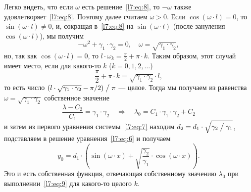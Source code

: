 Легко видеть, что если $\omega$ есть решение~\eqref{l7:eq:8}, то $-\omega$ также удовлетворяет~\eqref{l7:eq:8}. Поэтому далее считаем $\omega>0$. Если $\cos(\omega\cdot l)=0$, то $\sin(\omega\cdot l)\neq0${\mb,} и{\mb,} сокращая в~\eqref{l7:eq:8} на $\sin(\omega\cdot l)$ (после зануления $\cos(\omega\cdot l)$){\mb,} мы получим 
\begin{equation*}
	-\omega^2+\gamma_1\cdot\gamma_2=0,\quad\omega=\sqrt{\gamma_1\cdot\gamma_2},
\end{equation*}
но{\mb,} так как $\cos(\omega\cdot l)=0$, то $l\cdot\omega_k=\displaystyle\frac{\pi}{2}+\pi\cdot k$. Таким образом{\mb,} этот случай имеет место, если для какого-то $k$ ($k=0,1,2,\ldots$)
\begin{equation}
	\label{l7:eq:9}
	\frac{\pi}{2}+\pi\cdot k=\sqrt{\gamma_1\cdot\gamma_2}\cdot l,
\end{equation} 
то есть число $(l\cdot\sqrt{\gamma_1\cdot\gamma_2}-\pi/2)\bigm/\pi$ --- целое.  Тогда мы получаем из равенства $\omega=\sqrt{\gamma_1\cdot\gamma_2}$ собственное значение 
\begin{equation*}
	\frac{\lambda-C_2}{C_1}=\gamma_1\cdot\gamma_2\quad\Rightarrow\quad\lambda_0=C_1\cdot\gamma_1\cdot\gamma_2+C_2
\end{equation*}
и затем из первого уравнения системы~\eqref{l7:eq:7} находим $d_2=d_1\cdot\sqrt{\gamma_2\bigm/\gamma_1}$, подставляем в решение уравнения~\eqref{l7:eq:6} и получаем 
\begin{equation*}
	 y_0=d_1\cdot\left(\sin(\omega\cdot x)+\sqrt{\frac{\gamma_2}{\gamma_1}}\cdot\cos(\omega\cdot x)\right).
\end{equation*}
Это и есть собственная функция, отвечающая собственному значению $\lambda_0$ при выполнении~\eqref{l7:eq:9} для какого-то целого $k$. 

